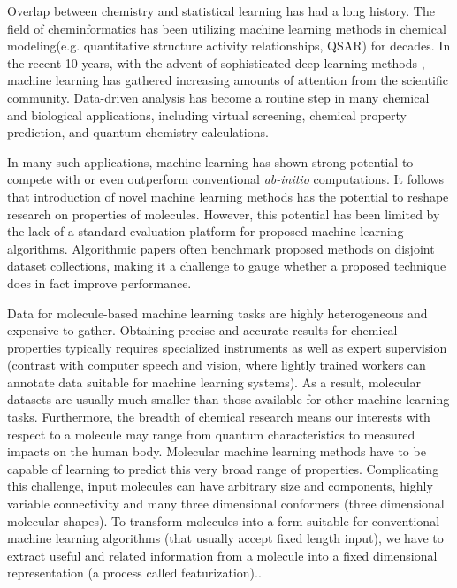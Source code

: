 Overlap between chemistry and 
statistical learning has had a long history. The field of cheminformatics has been utilizing machine learning methods in chemical modeling(e.g. quantitative structure activity relationships, QSAR) for decades.\cite{gasteiger1993neural, zupan1999neural, varnek2012machine, mitchell2014machine,devillers1996neural, schneider1998artificial} In the recent 10 years, with the advent of sophisticated deep learning methods \cite{DeepLearning, schmidhuber2015deep}, machine learning has gathered increasing amounts of attention from the scientific community. Data-driven analysis has become a routine step in many chemical and biological applications, including virtual screening\cite{ma2015deep, ramsundar2015massively, unterthiner2014deep, AtomNet}, chemical property prediction\cite{ESOL_dataset, lusci2013deep, SAMPL4, FreeSolv}, and quantum chemistry calculations\cite{GDB7_dataset_prl, GDB7_dataset_arxiv, schutt2016quantum, mcgibbon2017improving}. 

In many such applications, machine learning has shown strong potential to compete with or even outperform conventional \textit{ab-initio} computations\cite{FreeSolv, GDB7_dataset_arxiv}. It follows that introduction of novel machine learning methods has the potential to reshape research on properties of molecules. However, this potential has been limited by the lack of a standard evaluation platform for proposed machine learning algorithms. Algorithmic papers often benchmark proposed methods on disjoint dataset collections, making it a challenge to gauge whether a proposed technique does in fact improve performance.

Data for molecule-based machine learning tasks are highly heterogeneous and expensive to gather. Obtaining precise and accurate results for chemical properties typically requires specialized instruments as well as expert supervision (contrast with computer speech and vision, where lightly trained workers can annotate data suitable for machine learning systems). As a result, molecular datasets are usually much smaller than those available for other machine learning tasks. Furthermore, the breadth of chemical research means our interests with respect to a molecule may range from quantum characteristics to measured impacts on the human body. Molecular machine learning methods have to be capable of learning to predict this very broad range of properties. Complicating this challenge, input molecules can have arbitrary size and components, highly variable connectivity and many three dimensional conformers (three dimensional molecular shapes). To transform molecules into a form suitable for conventional machine learning algorithms (that usually accept fixed length input), we have to extract useful and related information from a molecule into a fixed dimensional representation (a process called featurization).\cite{ECFP, graphconv_feat, kearnes2016graphconv}.  

